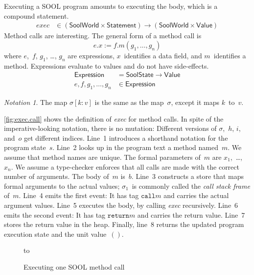 \documentclass[preprint]{sigplanconf} %
\newcommand{\set}[1]{\ensuremath{\mathsf{#1}}}
\theoremstyle{definition}
\theoremstyle{remark}
\newtheorem{notation}{Notation}
\begin{document}
Executing a SOOL program amounts to executing the \Verb@main@ body, which is a compound statement.
\begin{align}
\mathit{exec}&\in(\set{SoolWorld}\times\set{Statement})\to(\set{SoolWorld}\times\set{Value})
\end{align}
Method calls are interesting.
The general form of a method call is \[ e.x := f.m(g_1,\ldots,g_n)\] where $e$,~$f$, $g_1$, \dots, $g_n$ are expressions, $x$~identifies a data field, and $m$~identifies a method.
Expressions evaluate to values and do not have side-effects.
\begin{align}
\set{Expression}&=\set{SoolState}\to\set{Value} \\
e,f,g_1,\ldots,g_n&\in\set{Expression}
\end{align}

\begin{notation}
The map $\sigma[k:v]$ is the same as the map~$\sigma$, except it maps $k$~to~$v$.
\end{notation}

\autoref{fig:exec.call} shows the definition of \textit{exec} for method calls.
In spite of the imperative-looking notation, there is no mutation:
Different versions of $\sigma$,~$h$, $i$, and~$o$ get different indices.
Line~1 introduces a shorthand notation for the program state~$s$.
Line~2 looks up in the program text a method named~$m$.
We assume that method names are unique.
The formal parameters of~$m$ are $x_1$,~\dots,~$x_n$.
We assume a type-checker enforces that all calls are made with the correct number of arguments.
The body of~$m$ is~$b$.
Line~3 constructs a store that maps formal arguments to the actual values;
$\sigma_1$~is commonly called the \emph{call stack frame} of~$m$.
Line~4 emits the first event:
It has tag $\mathtt{call}m$ and carries the actual argument values.
Line~5 executes the body, by calling \textit{exec} recursively.
Line~6 emits the second event:
It has tag $\mathtt{return}m$ and carries the return value.
Line~7 stores the return value in the heap.
Finally, line~8 returns the updated program execution state and the unit value~$()$.

\begin{figure}
\hbox to
\caption{Executing one SOOL method call}
\label{fig:exec.call}
\end{figure}
\end{document}
